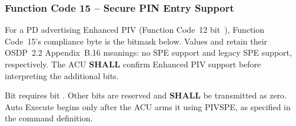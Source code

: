 

\subsubsection{Function Code 15 -- Secure PIN Entry Support}

For a PD advertising Enhanced PIV (Function Code~12 bit~),
Function Code~15's compliance byte is the bitmask below. Values 
and  retain their OSDP~2.2 Appendix~B.16 meanings: no SPE support
and legacy SPE support, respectively. The ACU \textbf{SHALL} confirm Enhanced
PIV support before interpreting the additional bits.



Bit  requires bit . Other bits are reserved and
\textbf{SHALL} be transmitted as zero. Auto Execute begins only after the
ACU arms it using PIVSPE, as specified in the command definition.
